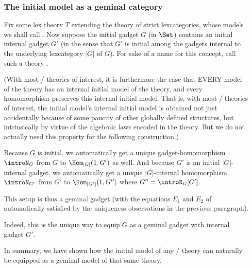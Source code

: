 \subsubsection{The initial model as a geminal category}
\begin{construction}\label{InitoGeminalYieldsGeminal}
Fix some lex theory $T$ extending the theory of strict lexcategories, whose models we shall call . Now suppose the initial gadget $G$ (in $\Set$) contains an initial internal gadget $G'$ (in the sense that $G'$ is initial among the gadgets internal to the underlying lexcategory $|G|$ of $G$). For sake of a name for this concept, call such a theory .


(With most \initogeminal/ theories of interest, it is furthermore the case that EVERY model of the theory has an internal initial model of the theory, and every homomorphism preserves this internal initial model. That is, with most \initogeminal/ theories of interest, the initial model's internal initial model is obtained not just accidentally because of some paucity of other globally defined structures, but intrinsically by virtue of the algebraic laws encoded in the theory. But we do not actually need this property for the following construction.)

Because $G$ is initial, we automatically get a unique gadget-homomorphism $\introN_{G}$ from $G$ to $\Hom_{|G|}(1, G')$ as well. And because $G'$ is an initial $|G|$-internal gadget, we automatically get a unique $|G|$-internal homomorphism $\introN_{G'}$ from $G'$ to $\Hom_{|G'|}(1, G'')$ where $G'' = \introN_{G}[G']$.

This setup is thus a geminal gadget (with the equations $E_1$ and $E_2$ of  automatically satisfied by the uniqueness observations in the previous paragraph).

Indeed, this is the unique way to equip $G$ as a geminal gadget with internal gadget $G'$.

In summary, we have shown how the initial model of any \initogeminal/ theory can naturally be equipped as a geminal model of that same theory.
\end{construction}

